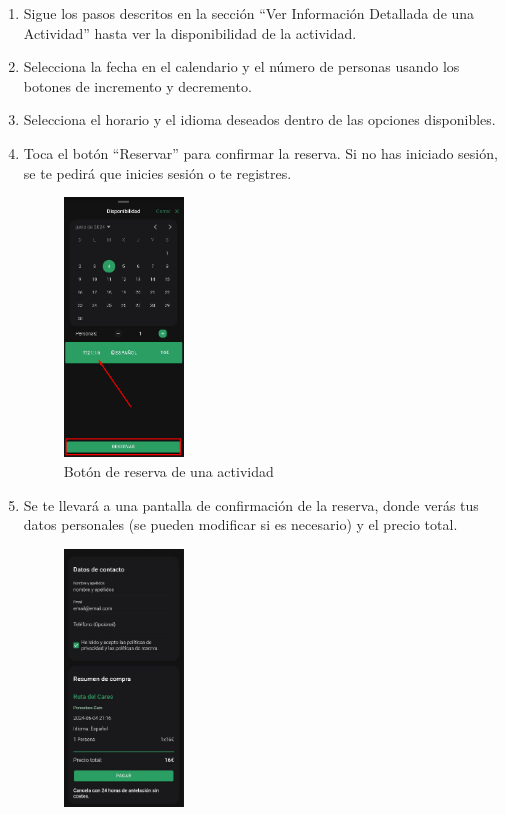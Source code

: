 \begin{enumerate}
	\item Sigue los pasos descritos en la sección “Ver Información Detallada de una Actividad” hasta ver la disponibilidad de la actividad.
	\item Selecciona la fecha en el calendario y el número de personas usando los botones de incremento y decremento.
	\item Selecciona el horario y el idioma deseados dentro de las opciones disponibles.
	\item Toca el botón “Reservar” para confirmar la reserva. Si no has iniciado sesión, se te pedirá que inicies sesión o te registres.
	      \begin{figure}[H]
		      \centering
		      \includegraphics[width=0.3\textwidth]{7-Construccion/Manuales/app/P1-Reservar.png}
		      \caption{Botón de reserva de una actividad}
	      \end{figure}
	\item Se te llevará a una pantalla de confirmación de la reserva, donde verás tus datos personales (se pueden modificar si es necesario) y el precio total.
	      \begin{figure}[H]
		      \centering
		      \includegraphics[width=0.3\textwidth]{7-Construccion/Manuales/app/P2-Reservar.png}

\end{figure}
\end{enumerate}
